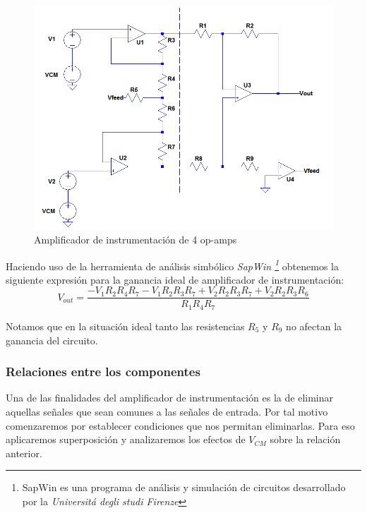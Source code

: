 \documentclass[a4paper]{article}
\begin{document}
	\begin{figure}[H]
		\centering
		\includegraphics[width=\linewidth]{../ImagenesVarias/inAmpSch.png}
		\caption{Amplificador de instrumentación de 4 op-amps}
	\end{figure}

	Haciendo uso de la herramienta de análisis simbólico \textit{SapWin \footnote{SapWin es una programa de análisis y simulación de circuitos desarrollado por la \textit{Universitá degli studi Firenze}}} obtenemos la siguiente expresión para la ganancia ideal de amplificador de instrumentación:
	\begin{equation}
			V_{out}=\frac{-V_1 R_2 R_4 R_7 - 
			V_1 R_2 R_3 R_7 +
			V_2 R_2 R_3 R_7+
			V_2 R_2 R_3 R_6
		}{R_1 R_4 R_7}
		\label{eqn:idealTrans}
	\end{equation}

	
	Notamos que en la situación ideal tanto las resistencias $R_5$ y $R_9$ no afectan la ganancia del circuito.
	\subsubsection{Relaciones entre los componentes}
	Una de las finalidades del amplificador de instrumentación es la de eliminar aquellas señales que sean comunes a las señales de entrada.
	Por tal motivo comenzaremos por establecer condiciones que nos permitan eliminarlas. 
	Para eso aplicaremos superposición y analizaremos los efectos de $V_{CM}$ sobre la relación anterior.
	
\end{document}
